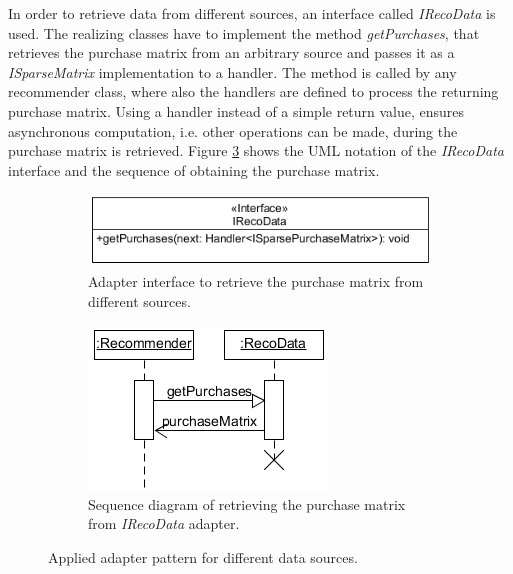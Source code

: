 \documentclass[10pt]{reportMaster}
\begin{document}
In order to retrieve data from different sources, an interface called \textit{IRecoData} is used.
The realizing classes have to implement the method \textit{getPurchases}, that retrieves the purchase matrix from an arbitrary source and passes it as a \textit{ISparseMatrix} implementation to a handler.
The method is called by any recommender class, where also the handlers are defined to process the returning purchase matrix.
Using a handler instead of a simple return value, ensures asynchronous computation, i.e. other operations can be made, during the purchase matrix is retrieved.
Figure \ref{fig:getPurchases} shows the UML notation of the \textit{IRecoData} interface and the sequence of obtaining the purchase matrix.


\begin{figure}[h!]
	\centering
	\begin{subfigure}[t]{0.6\textwidth}
		\includegraphics[width=\textwidth]{figures/implementation/IRecoDataInterface}
		\caption[Adapter interface for different data sources]{Adapter interface to retrieve the purchase matrix from different sources.}
		\label{fig:irecodataInterface}
	\end{subfigure}
	\begin{subfigure}[t]{0.35\textwidth}
		\includegraphics[width=\textwidth]{figures/implementation/getPurchasesSequence}
		\caption[Sequence diagram of for retrieving data]{Sequence diagram of retrieving the purchase matrix from \textit{IRecoData} adapter.}
		\label{fig:getPurchasesSequence}
	\end{subfigure}
	\caption[Class and sequence diagram of applied adapter pattern]{Applied adapter pattern for different data sources.}
	\label{fig:getPurchases}
\end{figure}
\end{document}

